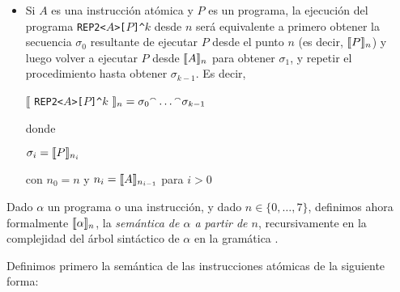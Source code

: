 \begin{itemize}
\begin{center}
\end{center}

\item Si $A$ es una instrucción atómica y $P$ es un programa, la ejecución del programa 
\verb#REP2<#$A$\verb#>[#$P$\verb#]^#$k$ desde $n$ será equivalente a primero obtener la secuencia $\sigma_0$ resultante de ejecutar $P$ desde el punto $n$ (es decir, $\llbracket P\rrbracket_n$) y luego volver a ejecutar $P$ desde $\llbracket A\rrbracket_n$ para obtener $\sigma_1$, y repetir el procedimiento hasta obtener $\sigma_{k-1}$. Es decir,

\begin{center}

$\llbracket$ \verb#REP2<#$A$\verb#>[#$P$\verb#]^#$k$  $\rrbracket_n = \sigma_0 {}^\smallfrown \dots {}^\smallfrown \sigma_{k-1}$

donde
      
      $\sigma_i = \llbracket P\rrbracket_{n_i} $
      
      con $n_0 = n$ y $n_i = \llbracket A\rrbracket_{n_{i-1}}$ para $i>0$ 


\end{center}

\end{itemize}

Dado $\alpha$ un programa o una instrucción, y dado $n\in\{0,\dots,7\}$, definimos ahora formalmente $\llbracket \alpha\rrbracket_n$, la {\em semántica de $\alpha$ a partir de $n$}, recursivamente en la complejidad del árbol sintáctico de $\alpha$ en la gramática \gramgeo.

Definimos primero la semántica de las instrucciones atómicas de la siguiente forma:

